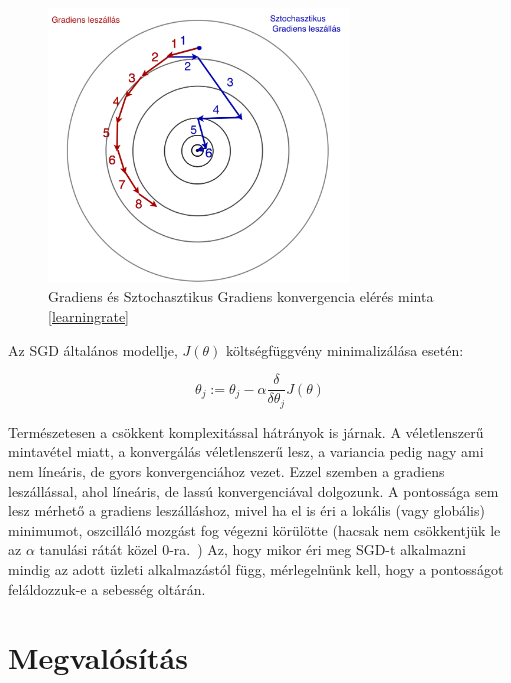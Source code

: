 \documentclass[a4paper,12pt]{article}
\begin{document}
\begin{figure}[ht!]
\centering
\includegraphics[width=80mm]{img/sgd_bgd.png}
\caption{Gradiens és Sztochasztikus Gradiens konvergencia elérés minta \ref{learningrate} \label{sgd_bgd}}
\end{figure}


Az SGD általános modellje, $J(\theta)$ költségfüggvény minimalizálása esetén:

\[\theta_j:=\theta_j-\alpha\frac{\delta}{\delta\theta_j}J(\theta)\]

Természetesen a csökkent komplexitással hátrányok is járnak. A véletlenszerű mintavétel miatt, a konvergálás véletlenszerű lesz, a variancia pedig nagy ami nem líneáris, de gyors konvergenciához vezet. Ezzel szemben a gradiens leszállással, ahol líneáris, de lassú konvergenciával dolgozunk. A pontossága sem lesz mérhető a gradiens leszálláshoz, mivel ha el is éri a lokális (vagy globális) minimumot, oszcilláló mozgást fog végezni körülötte (hacsak nem csökkentjük le az $\alpha$ tanulási rátát közel 0-ra.~\cite{bottou})
Az, hogy mikor éri meg SGD-t alkalmazni mindig az adott üzleti alkalmazástól függ, mérlegelnünk kell, hogy a pontosságot feláldozzuk-e a sebesség oltárán.


\section{Megvalósítás}
\end{document}
